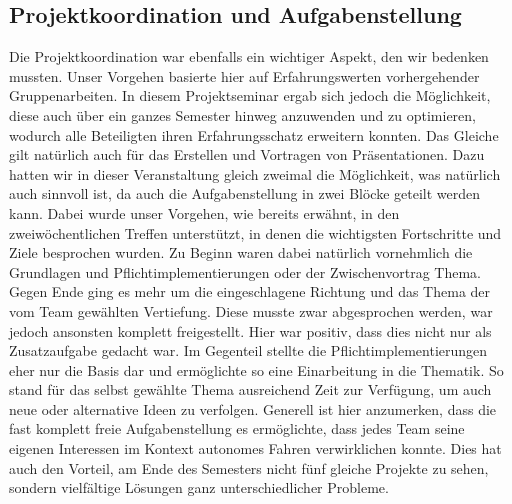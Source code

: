 \subsection{Projektkoordination und Aufgabenstellung}
Die Projektkoordination war ebenfalls ein wichtiger Aspekt, den wir bedenken mussten. Unser Vorgehen basierte hier auf Erfahrungswerten vorhergehender Gruppenarbeiten. In diesem Projektseminar ergab sich jedoch die Möglichkeit, diese auch über ein ganzes Semester hinweg anzuwenden und zu optimieren, wodurch alle Beteiligten ihren Erfahrungsschatz erweitern konnten. Das Gleiche gilt natürlich auch für das Erstellen und Vortragen von Präsentationen. Dazu hatten wir in dieser Veranstaltung gleich zweimal die Möglichkeit, was natürlich auch sinnvoll ist, da auch die Aufgabenstellung in zwei Blöcke geteilt werden kann. Dabei wurde unser Vorgehen, wie bereits erwähnt, in den zweiwöchentlichen Treffen unterstützt, in denen die wichtigsten Fortschritte und Ziele besprochen wurden. Zu Beginn waren dabei natürlich vornehmlich die Grundlagen und Pflichtimplementierungen oder der Zwischenvortrag Thema. Gegen Ende ging es mehr um die eingeschlagene Richtung und das Thema der vom Team gewählten Vertiefung. Diese musste zwar abgesprochen werden, war jedoch ansonsten komplett freigestellt. Hier war positiv, dass dies nicht nur als Zusatzaufgabe gedacht war. Im Gegenteil stellte die Pflichtimplementierungen eher nur die Basis dar und ermöglichte so eine Einarbeitung in die Thematik. So stand für das selbst gewählte Thema ausreichend Zeit zur Verfügung, um auch neue oder alternative Ideen zu verfolgen.
\newline
Generell ist hier anzumerken, dass die fast komplett freie Aufgabenstellung es ermöglichte, dass jedes Team seine eigenen  Interessen im Kontext autonomes Fahren verwirklichen konnte. Dies hat auch den Vorteil, am Ende des Semesters nicht fünf gleiche Projekte zu sehen, sondern vielfältige Lösungen ganz unterschiedlicher Probleme.

